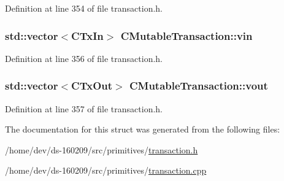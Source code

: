 Definition at line 354 of file transaction.\+h.

\hypertarget{struct_c_mutable_transaction_ad6b1a0a773293fd153a1d384923631da}{}
\subsubsection[{vin}]{\setlength{\rightskip}{0pt plus 5cm}std\+::vector$<${\bf C\+Tx\+In}$>$ C\+Mutable\+Transaction\+::vin}\label{struct_c_mutable_transaction_ad6b1a0a773293fd153a1d384923631da}


Definition at line 356 of file transaction.\+h.

\hypertarget{struct_c_mutable_transaction_aca14a252c78e4af2dfe68d7ea67a77dc}{}
\subsubsection[{vout}]{\setlength{\rightskip}{0pt plus 5cm}std\+::vector$<${\bf C\+Tx\+Out}$>$ C\+Mutable\+Transaction\+::vout}\label{struct_c_mutable_transaction_aca14a252c78e4af2dfe68d7ea67a77dc}


Definition at line 357 of file transaction.\+h.



The documentation for this struct was generated from the following files\+:\begin{DoxyCompactItemize}
\item 
/home/dev/ds-\/160209/src/primitives/\hyperlink{transaction_8h}{transaction.\+h}\item 
/home/dev/ds-\/160209/src/primitives/\hyperlink{transaction_8cpp}{transaction.\+cpp}\end{DoxyCompactItemize}
